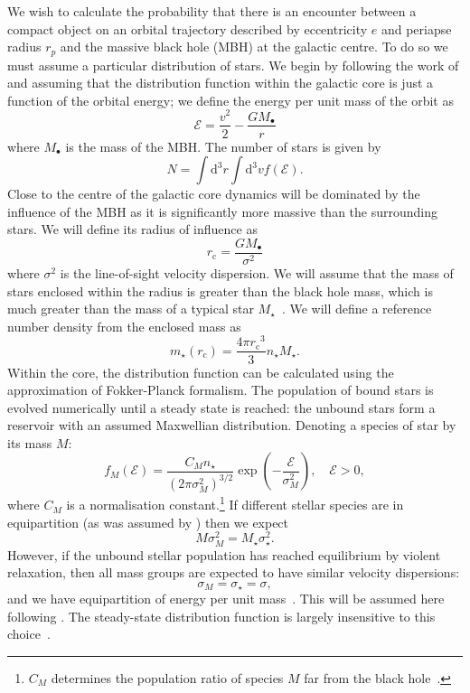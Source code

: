 \documentclass[useAMS,usedcolumn,usegraphicx,usenatbib]{mn2e}
\newcommand{\sub}[1]{\ensuremath{_\mathrm{#1}}}
\newcommand{\dd}{\ensuremath{\mathrm{d}}}
\begin{document}
We wish to calculate the probability that there is an encounter between a compact object on an orbital trajectory described by eccentricity $e$ and periapse radius $r_p$ and the massive black hole (MBH) at the galactic centre. To do so we must assume a particular distribution of stars. We begin by following the work of \citet{Bahcall1976, Bahcall1977} and assuming that the distribution function within the galactic core is just a function of the orbital energy; we define the energy per unit mass of the orbit as
\begin{equation}
\mathcal{E} = \frac{v^2}{2} - \frac{GM_\bullet}{r}
\end{equation}
where $M_\bullet$ is the mass of the MBH. The number of stars is given by
\begin{equation}
N = \int \dd^3r \int \dd^3v f(\mathcal{E}).
\end{equation}
Close to the centre of the galactic core dynamics will be dominated by the influence of the MBH as it is significantly more massive than the surrounding stars. We will define its radius of influence as~\citep{Frank1976}
\begin{equation}
r\sub{c} = \frac{GM_\bullet}{\sigma^2}
\end{equation}
where $\sigma^2$ is the line-of-sight velocity dispersion. We will assume that the mass of stars enclosed within the radius is greater than the black hole mass, which is much greater than the mass of a typical star $M_\star$~\citep{Bahcall1976}. We will define a reference number density from the enclosed mass as
\begin{equation}
m_\star(r\sub{c}) = \frac{4\pi r\sub{c}^3}{3}n_\star M_\star.
\end{equation}
Within the core, the distribution function can be calculated using the approximation of Fokker-Planck formalism. The population of bound stars is evolved numerically until a steady state is reached: the unbound stars form a reservoir with an assumed Maxwellian distribution. Denoting a species of star by its mass $M$:
\begin{equation}
f_M(\mathcal{E}) = \frac{C_M n_\star}{(2\pi\sigma_M^2)^{3/2}} \exp\left(-\frac{\mathcal{E}}{\sigma_M^2}\right),\quad\mathcal{E} > 0,
\label{eq:Unbound_DF}
\end{equation}
where $C_M$ is a normalisation constant.\footnote{$C_M$ determines the population ratio of species $M$ far from the black hole~\cite{Alexander2009}.} If different stellar species are in equipartition (as was assumed by \citealt{Bahcall1976, Bahcall1977}) then we expect
\begin{equation}
M \sigma_M^2 = M_\star \sigma_\star^2.
\end{equation}
However, if the unbound stellar population has reached equilibrium by violent relaxation, then all mass groups are expected to have similar velocity dispersions:
\begin{equation}
\sigma_M = \sigma_\star = \sigma,
\end{equation}
and we have equipartition of energy per unit mass~\citep{Lynden-Bell1967}. This will be assumed here following \citet{Alexander2009, O'Leary2009}. The steady-state distribution function is largely insensitive to this choice~\citep{Bahcall1977, Alexander2009}.
\end{document}
